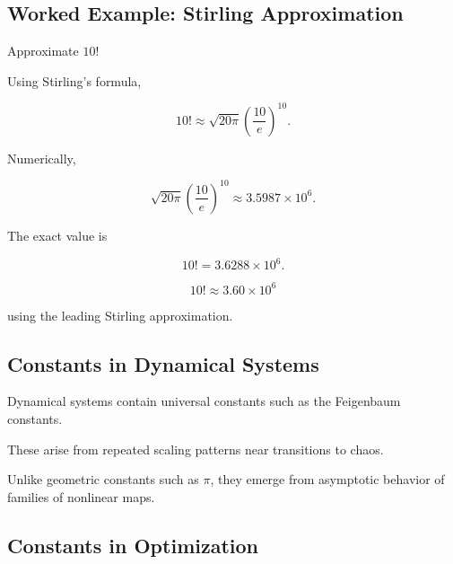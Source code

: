 \subsection{Worked Example: Stirling Approximation}
\label{subsec:worked-stirling-approximation}

\begin{workedexamplebox}{Approximate \(10!\)}

Using Stirling's formula,

\[
10!
\approx
\sqrt{20\pi}
\left(
\frac{10}{e}
\right)^{10}.
\]

Numerically,

\[
\sqrt{20\pi}
\left(
\frac{10}{e}
\right)^{10}
\approx
3.5987\times10^6.
\]

The exact value is

\[
10!
=
3.6288\times10^6.
\]

\begin{answerbox}
\[
\boxed{
10!
\approx
3.60\times10^6
}
\]

using the leading Stirling approximation.
\end{answerbox}

\end{workedexamplebox}

\subsection{Constants in Dynamical Systems}
\label{subsec:constants-in-dynamical-systems}

Dynamical systems contain universal constants such as the Feigenbaum
constants.

These arise from repeated scaling patterns near transitions to chaos.

Unlike geometric constants such as \(\pi\), they emerge from asymptotic
behavior of families of nonlinear maps.

\subsection{Constants in Optimization}
\label{subsec:constants-in-optimization}

